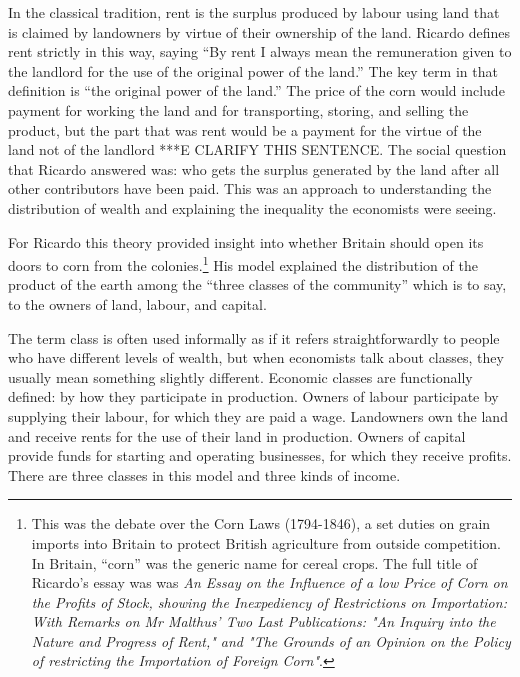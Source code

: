  In the classical tradition, rent is the surplus produced by labour using land that is claimed by landowners by virtue of their ownership of the land. Ricardo defines rent strictly in this way, saying ``By rent I always mean the remuneration given to the landlord for the use of the original power of the land.''\cite{ricardoEssayInfluenceLow1815} The key term in that definition is ``the original power of the land.'' The price of the corn would include payment for working the land and for transporting, storing, and  selling the product, but the part that was rent would be a payment for the virtue of the land not of the landlord ***E CLARIFY THIS SENTENCE. The social question that Ricardo answered was: who gets the surplus generated by the land after all other contributors have been paid. This was an approach to understanding the distribution of wealth and explaining the inequality the economists were seeing. 
 
 For Ricardo this theory provided insight into whether Britain should open its doors to corn from the colonies.\footnote{This was the debate over the Corn Laws (1794-1846), a set duties on grain imports into Britain to protect British agriculture from outside competition. In Britain, ``corn'' was the generic name for cereal crops. The full title of Ricardo's essay was was \textit{An Essay on the Influence of a low Price of Corn on the Profits of Stock, showing the Inexpediency of Restrictions on Importation: With Remarks on Mr Malthus' Two Last Publications: "An Inquiry into the Nature and Progress of Rent," and "The Grounds of an Opinion on the Policy of restricting the Importation of Foreign Corn"}.}
His model  explained the distribution of the product of the earth among the “three classes of the community” which is to say, to the owners of land, labour, and capital. 

The term \gls{class} is often used informally as if it refers straightforwardly to people who have different levels of wealth, but when economists talk about classes, they usually mean something slightly different. Economic classes are functionally defined:  by how they participate in production. Owners of labour participate by supplying their labour, for which they are paid a wage. Landowners own the land and receive rents for the use of their land in production. Owners of capital provide funds for starting and operating businesses, for which they receive profits.  There are three classes in this model and three kinds of income.  %

